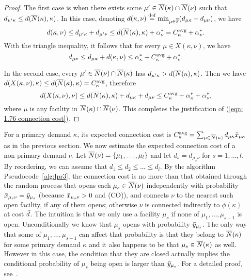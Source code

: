 \begin{proof}
 The first case is when there exists some $\mu'\in
{\overline{N}}(\kappa) \cap {\overline{N}}(\nu)$ such that $d_{\mu' \kappa}
\leq d({\overline{N}}(\kappa), \kappa)$. In this case, denoting
$d(\kappa, \nu) \stackrel{\mathrm{def}}{=}\min_{\mu\in\overline{\mathbb{F}}} (d_{\mu\kappa} +
d_{\mu\nu})$, we have
\begin{equation*}
  d(\kappa,\nu)\leq
  d_{\mu'\kappa} + d_{\mu'\nu} \leq d({\overline{N}}(\kappa),\kappa) +
  \alpha_{\nu}^\ast=C^{{\mbox{\scriptsize\rm avg}}}_{\kappa} + \alpha_{\nu}^\ast. 
\end{equation*}
With the triangle inequality, it follows that for every
$\mu\in X(\kappa,\nu)$, we have
\begin{equation*}
  d_{\mu\nu} \leq d_{\mu\kappa} + d(\kappa,\nu) \leq
  \alpha_{\kappa}^\ast + C^{{\mbox{\scriptsize\rm avg}}}_{\kappa} + \alpha_{\nu}^\ast.
\end{equation*}

 In the second case, every $\mu'\in
{\overline{N}}(\nu)\cap {\overline{N}}(\kappa)$ has $d_{\mu'\kappa} >
d({\overline{N}}(\kappa),\kappa)$. Then we have
$d(X(\kappa,\nu),\kappa)\leq
d({\overline{N}}(\kappa),\kappa)=C^{{\mbox{\scriptsize\rm avg}}}_{\kappa}$, therefore
\begin{equation*}
  d(X(\kappa,\nu), \nu) \leq d({\overline{N}}(\kappa), \kappa) +
  d_{\mu\kappa} + d_{\mu\nu} \leq C^{{\mbox{\scriptsize\rm avg}}}_{\kappa} +
  \alpha_{\kappa}^\ast + \alpha_{\nu}^\ast,  
\end{equation*}
where $\mu$ is any facility in ${\overline{N}}(\kappa)\cap {\overline{N}}(\nu)$.
This completes the justification of (\ref{eqn: 1.76
  connection cost}).
\end{proof}

For a primary demand $\kappa$, its expected connection cost
is $C^{\mbox{\scriptsize\rm avg}}_{\kappa} = \sum_{\mu\in{\overline{N}}(\kappa)}
d_{\mu\kappa}{\bar x}_{\mu\kappa}$ as in the previous
section. We now estimate the expected connection cost of a
non-primary demand $\nu$. Let ${\overline{N}}(\nu) =
{ \left\{ \mu_1,\ldots,\mu_l \right\} }$ and let $d_s = d_{\mu_s\nu}$
for $s = 1,\ldots,l$. By reordering, we can assume that $d_1
\le d_2 \le \ldots \le d_l$. By the algorithm
Pseudocode~\ref{alg:lpr3}, the connection cost is no more
than that obtained through the random process that opens
each $\mu_s\in {\overline{N}}(\nu)$ independently with probability
${\bar x}_{\mu_s \nu} ={\bar y}_{\mu_s}$ (because ${\bar x}_{\mu_s
  \nu} > 0$ and (CO)), and connects $\nu$ to the nearest
such open facility, if any of them opens; otherwise $\nu$ is
connected indirectly to $\phi(\kappa)$ at cost ${\bar d}$. The
intuition is that we only use a facility $\mu_s$ if none of
$\mu_1,\ldots,\mu_{s-1}$ is open. Unconditionally we know
that $\mu_s$ opens with probability ${\bar y}_{\mu_s}$. The
only way that some of $\mu_1,\ldots,\mu_{s-1}$ can affect
that probability is that they belong to ${\overline{N}}(\kappa)$ for
some primary demand $\kappa$ and it also happens to be that
$\mu_s \in {\overline{N}}(\kappa)$ as well. However in this case,
the condition that they are closed actually implies the
conditional probability of $\mu_s$ being open is larger than
${\bar y}_{\mu_s}$. For a detailed proof, see~\cite{ChudakS04}.

